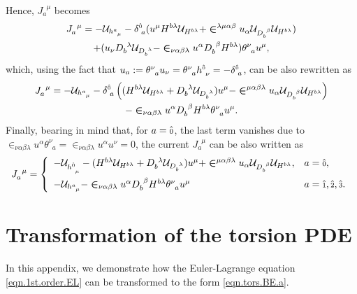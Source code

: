 \documentclass[
10pt, %
a4paper, %
oneside, %
headinclude,footinclude, %
BCOR5mm, %
]{scrartcl}
\newcommand{\tetrsymbol}{h}
\newcommand{\itetrsymbol}{\theta}
\newcommand{\itetr}[2]{\itetrsymbol^{#1}_{\phantom{#1}#2}}
\newcommand{\tetr}[2]{\tetrsymbol^{#1}_{\phantom{#1}#2}}
\newcommand{\eT}[2]{D_{#1}^{\phantom{#1}#2}}	%
\newcommand{\hT}[2]{H^{#1#2}}	%
\newcommand{\LagST}{\mathcal{U}}%
\newcommand{\LCsymb}{\bm{\in}}    %
\newcommand{\KD}[2]{\delta^{#1}_{\,\,#2}}
\newcommand{\NC}[2]{J^{\phantom{#1}#2}_{#1}}
\newcommand{\indlat}[1]{\hat{\mathsmaller{#1}}}
\begin{document}
Hence, $ \NC{a}{\mu} $ becomes
\begin{multline}
\NC{a}{\mu} =
-\LagST_{\tetr{a}{\mu}} 
- \KD{\indlat{0}}{a}
(u^\mu \hT{b}{\lambda} \LagST_{\hT{b}{\lambda}} + \LCsymb^{\lambda\mu\alpha\beta} u_\alpha 
\LagST_{\eT{b}{\beta}} \LagST_{\hT{b}{\lambda}}) \\
+ ( u_\nu \eT{b}{\lambda} \LagST_{\eT{b}{\lambda}} - 
\LCsymb_{\nu\alpha\beta\lambda}u^\alpha\eT{b}{\beta}\hT{b}{\lambda})\itetr{\nu}{a}u^\mu,
\end{multline}
which, using the fact that $ u_a := \itetr{\nu}{a}u_\nu = \itetr{\nu}{a} \tetr{\indlat{0}}{\nu} = 
-\KD{\indlat{0}}{a} $, can be also rewritten as
\begin{multline}\label{app.eqn.Noether2}
\NC{a}{\mu} = 
-\LagST_{\tetr{a}{\mu}} 
- \KD{\indlat{0}}{a}
\left((\hT{b}{\lambda} \LagST_{\hT{b}{\lambda}} 
+ \eT{b}{\lambda} \LagST_{\eT{b}{\lambda}} )u^\mu
- \LCsymb^{\mu\alpha\beta\lambda} u_\alpha 
\LagST_{\eT{b}{\beta}} \LagST_{\hT{b}{\lambda}} \right) \\ 
- \LCsymb_{\nu\alpha\beta\lambda}u^\alpha\eT{b}{\beta}\hT{b}{\lambda}\itetr{\nu}{a}u^\mu.
\end{multline}
Finally, bearing in mind that, for $ a=\indlat{0} $, the last term vanishes due to $ 
\LCsymb_{\nu\alpha\beta\lambda}u^\alpha\itetr{\nu}{a} =  
\LCsymb_{\nu\alpha\beta\lambda}u^\alpha u^\nu = 0$, the current $ \NC{a}{\mu} $ can be also written 
as
\begin{equation}
	\NC{a}{\mu} = \left\{
	\begin{array}{ll}
	-\LagST_{\tetr{\indlat{0}}{\mu}} 
	- (\hT{b}{\lambda} \LagST_{\hT{b}{\lambda}} 
	+ \eT{b}{\lambda} \LagST_{\eT{b}{\lambda}} )u^\mu
	+ \LCsymb^{\mu\alpha\beta\lambda} u_\alpha 
	\LagST_{\eT{b}{\beta}} \LagST_{\hT{b}{\lambda}},	& a=\indlat{0},  \\[3mm] 
	-\LagST_{\tetr{a}{\mu}}	
	- \LCsymb_{\nu\alpha\beta\lambda}u^\alpha\eT{b}{\beta}\hT{b}{\lambda}\itetr{\nu}{a}u^\mu & a = 
	\indlat{1},\indlat{2},\indlat{3}. \\ 
	\end{array} 
	\right.
\end{equation}

\section{Transformation of the torsion PDE}\label{app.sec.Deqn}

In this appendix, we demonstrate how the Euler-Lagrange equation \eqref{eqn.1st.order.EL} can be 
transformed to the form \eqref{eqn.tors.BE.a}.
\end{document}
